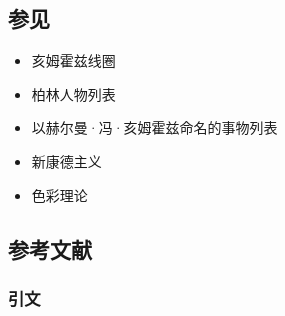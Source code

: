\subsection{参见}
\begin{itemize}
\item 亥姆霍兹线圈
\item 柏林人物列表
\item 以赫尔曼·冯·亥姆霍兹命名的事物列表
\item 新康德主义
\item 色彩理论
\end{itemize}
\subsection{参考文献}
\subsubsection{引文}
